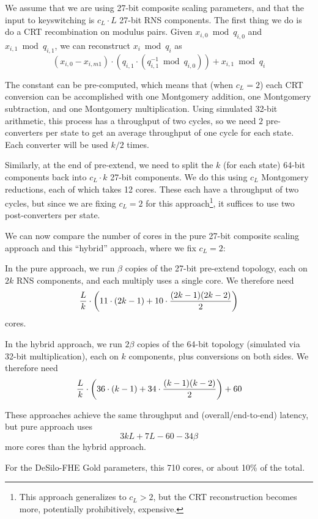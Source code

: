 \documentclass[../../fheimpl.tex]{subfiles}
\begin{document}
	We assume that we are using 27-bit composite scaling parameters, and that the input to keyswitching is $c_L\cdot L$ 27-bit RNS components. The first thing we do is do a CRT recombination on modulus pairs. Given $x_{i,0}\bmod q_{i,0}$ and $x_{i,1} \bmod q_{i,1}$, we can reconstruct $x_i\bmod q_i$ as
	\[(x_{i,0}-x_{i,m1})\cdot (q_{i,1}\cdot (q_{i,1}^{-1}\bmod q_{i,0})) + x_{i,1} \bmod q_i\]
	
	The constant can be pre-computed, which means that (when $c_L=2$) each CRT conversion can be accomplished with one Montgomery addition, one Montgomery subtraction, and one Montgomery multiplication. Using simulated 32-bit arithmetic, this process has a throughput of two cycles, so we need $2$ pre-converters per state to get an average throughput of one cycle for each state. Each converter will be used $k/2$ times.
	
	Similarly, at the end of pre-extend, we need to split the $k$ (for each state) 64-bit components back into $c_L\cdot k$ 27-bit components. We do this using $c_L$ Montgomery reductions, each of which takes 12 cores. These each have a throughput of two cycles, but since we are fixing $c_L=2$ for this approach\footnote{This approach generalizes to $c_L>2$, but the CRT reconstruction becomes more, potentially prohibitively, expensive.}, it suffices to use two post-converters per state.
	
	We can now compare the number of cores in the pure 27-bit composite scaling approach and this ``hybrid'' approach, where we fix $c_L=2$:
	
	In the pure approach, we run $\beta$ copies of the 27-bit pre-extend topology, each on $2k$ RNS components, and each multiply uses a single core. We therefore need
	\[\frac{L}{k}\cdot\parens*{11\cdot(2k-1)+10\cdot\frac{(2k-1)(2k-2)}{2}}\]
	cores.
	
	In the hybrid approach, we run $2\beta$ copies of the 64-bit topology (simulated via 32-bit multiplication), each on $k$ components, plus conversions on both sides. We therefore need
	\[\frac{L}{k}\cdot\parens*{36\cdot(k-1)+34\cdot\frac{(k-1)(k-2)}{2}} + 60\]
	
	These approaches achieve the same throughput and (overall/end-to-end) latency, but pure approach uses 
	\[3kL+7L-60-34\beta\]
	more cores than the hybrid approach.
	
	For the DeSilo-FHE Gold parameters, this 710 cores, or about 10\% of the total.
	
\end{document}
